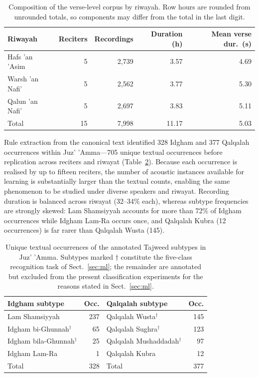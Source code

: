 \documentclass[runningheads]{llncs}
\begin{document}
\begin{table}[t]
\centering
\caption{Composition of the verse-level corpus by riwayah. Row
hours are rounded from unrounded totals, so components may differ from the
total in the last digit.}
\label{tab:corpus}
\begin{tabular}{lrrrr}
\hline
Riwayah & Reciters & Recordings & Duration (h) & Mean verse dur.\ (s) \\
\hline
Hafs 'an 'Asim  & 5 & 2{,}739 & 3.57 & 4.69 \\
Warsh 'an Nafi' & 5 & 2{,}562 & 3.77 & 5.30 \\
Qalun 'an Nafi' & 5 & 2{,}697 & 3.83 & 5.11 \\
\hline
Total           & 15 & 7{,}998 & 11.17 & 5.03 \\
\hline
\end{tabular}
\end{table}

Rule extraction from the canonical text identified 328 Idgham and 377 Qalqalah
occurrences within Juz' 'Amma---705 unique textual occurrences before
replication across reciters and riwayat (Table~\ref{tab:occurrences}). Because
each occurrence is realised by up to fifteen reciters, the number of acoustic
instances available for learning is substantially larger than the textual
counts, enabling the same phenomenon to be studied under diverse speakers and
riwayat. Recording duration is balanced across riwayat (32--34\% each), whereas
subtype frequencies are strongly skewed: Lam Shamsiyyah accounts for more than
72\% of Idgham occurrences while Idgham Lam-Ra occurs once, and Qalqalah Kubra
(12 occurrences) is far rarer than Qalqalah Wusta (145).

\begin{table}[t]
\centering
\caption{Unique textual occurrences of the annotated Tajweed subtypes in Juz'
'Amma. Subtypes marked $\dagger$ constitute the five-class recognition task of
Sect.~\ref{sec:ml}; the remainder are annotated but excluded from the present
classification experiments for the reasons stated in Sect.~\ref{sec:ml}.}
\label{tab:occurrences}
\begin{tabular}{lrlr}
\hline
Idgham subtype & Occ. & Qalqalah subtype & Occ. \\
\hline
Lam Shamsiyyah & 237 & Qalqalah Wusta$^\dagger$       & 145 \\
Idgham bi-Ghunnah$^\dagger$ & 65 & Qalqalah Sughra$^\dagger$      & 123 \\
Idgham bila-Ghunnah$^\dagger$ & 25 & Qalqalah Mushaddadah$^\dagger$ & 97 \\
Idgham Lam-Ra & 1 & Qalqalah Kubra & 12 \\
\hline
Total & 328 & Total & 377 \\
\hline
\end{tabular}
\end{table}
\end{document}
